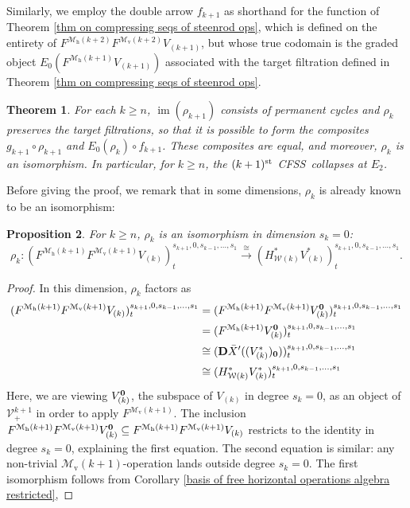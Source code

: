 \documentclass[11pt]{amsart} \renewcommand{\baselinestretch}{1.2}
\theoremstyle{plain}
\newtheorem{thm}{Theorem}[section] %
\newtheorem{prop}[thm]{Proposition}
\numberwithin{equation}{section} %
\theoremstyle{plain}
\newtheorem{thm}{Theorem}[chapter] %
\newtheorem{prop}[thm]{Proposition}
\numberwithin{equation}{chapter} %
\DeclareMathOperator{\im}{im}
\renewcommand{\to}{\longrightarrow}
\newcommand{\calV}{\mathcal{V}}
\newcommand{\calw}{\mathcal{W}}
\newcommand{\calMv}{\mathcal{M}\dver}
\newcommand{\calMh}{\mathcal{M}\dhor}
\newcommand{\vect}[2]{\calV^{#1}_{#2}}
\newcommand{\UEAX}{\bar{X}'}%
\newcommand{\dver}{_\mathrm{v}}
\newcommand{\dhor}{_\mathrm{h}}
\newcommand{\dual}{\mathbf{D}}
\newcommand{\CFSS}{CFSS}
\begin{document}
\begin{Calculations of HWn}
Similarly, we employ the double arrow $f_{k+1}$ as shorthand for the function of Theorem \ref{thm on compressing seqs of steenrod ops}, which is defined on the entirety of $F^{\calMh(k+2)}F^{\calMv(k+2)}V_{(k+1)}$, but whose true codomain is the graded object $E_0(F^{\calMh(k+1)}V_{(k+1)})$ associated with the target filtration defined in Theorem \ref{thm on compressing seqs of steenrod ops}.
\begin{thm}
\label{thm on collapsing of most sseqs}
For each $k\geq n$, $\im(\rho_{k+1})$ consists of permanent cycles and $\rho_k$ preserves the target filtrations, so that it is possible to form the composites $g_{k+1}\circ \rho_{k+1}$ and $E_0(\rho_{k})\circ f_{k+1}$. These composites are equal, and moreover, $\rho_k$ is an isomorphism. In particular, for $k\geq n$, the  $(k+1)^{\textup{st}}$ \CFSS\ collapses at $E_2$.
\end{thm}
Before giving the proof, we remark that in some dimensions, $\rho_k$ is already known to be an isomorphism:
\begin{prop}
\label{isomorphism rho k in some dims}
For $k\geq n$, $\rho_k$ is an isomorphism in dimension $s_k=0$:
\[\rho_k:(F^{\calMh(k+1)}F^{\calMv(k+1)}V_{(k)})^{s_{k+1},0,s_{k-1},\ldots,s_1}_{t} \overset{\cong}{\to}(H^*_{\calw(k)}V^*_{(k)})^{s_{k+1},0,s_{k-1},\ldots,s_1}_{t}.\]
\end{prop}
\begin{proof}
In this dimension, $\rho_k$ factors as
\begin{alignat*}{2}
(F^{\calMh(k+1)}F^{\calMv(k+1)}V_{(k)})^{s_{k+1},0,s_{k-1},\ldots,s_1}_{t}
&=
(F^{\calMh(k+1)} F^{\calMv(k+1)}V_{(k)}^{\textbf{\textup{0}}})^{s_{k+1},0,s_{k-1},\ldots,s_1}_{t}\\
&=(F^{\calMh(k+1)}V_{(k)}^{\textbf{\textup{0}}})^{s_{k+1},0,s_{k-1},\ldots,s_1}_{t}\\
&\cong (\dual\UEAX((V^*_{(k)})_{\textbf{\textup{0}}}))^{s_{k+1},0,s_{k-1},\ldots,s_1}_{t}\\
&\cong (H^*_{\calw(k)}V^*_{(k)})^{s_{k+1},0,s_{k-1},\ldots,s_1}_{t}
\end{alignat*}
Here, we are viewing $V_{(k)}^{\textbf{\textup{0}}}$, the subspace of $V_{(k)}$ in degree $s_k=0$, as an object of $\vect{k+1}{+}$ in order to apply $F^{\calMv(k+1)}$. The inclusion $F^{\calMh(k+1)}F^{\calMv(k+1)}V_{(k)}^{\textbf{\textup{0}}}\subseteq F^{\calMh(k+1)}F^{\calMv(k+1)}V_{(k)}$ restricts to the identity in degree $s_k=0$, explaining the first equation. The second equation is similar: any non-trivial $\calMv(k+1)$-operation lands outside degree $s_k=0$. The first isomorphism follows from Corollary \ref{basis of free horizontal operations algebra restricted}, %

\end{proof}
\end{Calculations of HWn}
\end{document}
